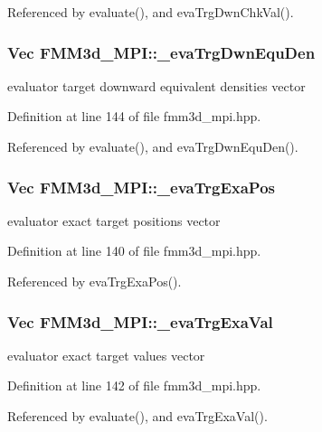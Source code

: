 Referenced by evaluate(), and eva\-Trg\-Dwn\-Chk\-Val().
\subsubsection{\setlength{\rightskip}{0pt plus 5cm}Vec {\bf FMM3d\_\-MPI::\_\-eva\-Trg\-Dwn\-Equ\-Den}\hspace{0.3cm}{\tt  [protected]}}\label{classFMM3d__MPI_9d2205231f4765d670aae9b255371221_9d2205231f4765d670aae9b255371221}


evaluator target downward equivalent densities vector 

Definition at line 144 of file fmm3d\_\-mpi.hpp.

Referenced by evaluate(), and eva\-Trg\-Dwn\-Equ\-Den().
\subsubsection{\setlength{\rightskip}{0pt plus 5cm}Vec {\bf FMM3d\_\-MPI::\_\-eva\-Trg\-Exa\-Pos}\hspace{0.3cm}{\tt  [protected]}}\label{classFMM3d__MPI_d92c77cb5e644436ca9baf702937d9a7_d92c77cb5e644436ca9baf702937d9a7}


evaluator exact target positions vector 

Definition at line 140 of file fmm3d\_\-mpi.hpp.

Referenced by eva\-Trg\-Exa\-Pos().
\subsubsection{\setlength{\rightskip}{0pt plus 5cm}Vec {\bf FMM3d\_\-MPI::\_\-eva\-Trg\-Exa\-Val}\hspace{0.3cm}{\tt  [protected]}}\label{classFMM3d__MPI_4cbc68497c6d437b43d73d78dd390a87_4cbc68497c6d437b43d73d78dd390a87}


evaluator exact target values vector 

Definition at line 142 of file fmm3d\_\-mpi.hpp.

Referenced by evaluate(), and eva\-Trg\-Exa\-Val().
